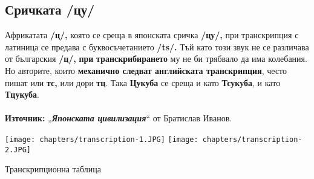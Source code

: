 \subsection{Сричката /цу/}
Африкатата \textbf{/ц/,} която се среща в японската сричка \textbf{/цу/,} при транскрипция с латиница се предава с буквосъчетанието \textbf{/ts/.} Тъй като този звук не се различава от българския \textbf{/ц/,} \textbf{при} \textbf{транскрибирането} му не би трябвало да има колебания.
Но авторите, които \textbf{механично следват английската транскрипция}, често пишат или\textbf{ тс, }или\textbf{ }дори\textbf{ тц}. Така \textbf{Цукуба} се среща и като \textbf{Тсукуба}, и като \textbf{Тцукуба}. \\\\

\textbf{Източник:} „\textbf{\textit{Японската цивилизация}}“ от Братислав Иванов.
 
\begin{table}[htbp]
    \centering
    \texttt{[image: chapters/transcription-1.JPG]}
    \texttt{[image: chapters/transcription-2.JPG]}
    \caption{Транскрипционна таблица}
\end{table}

\clearpage


%  
  
